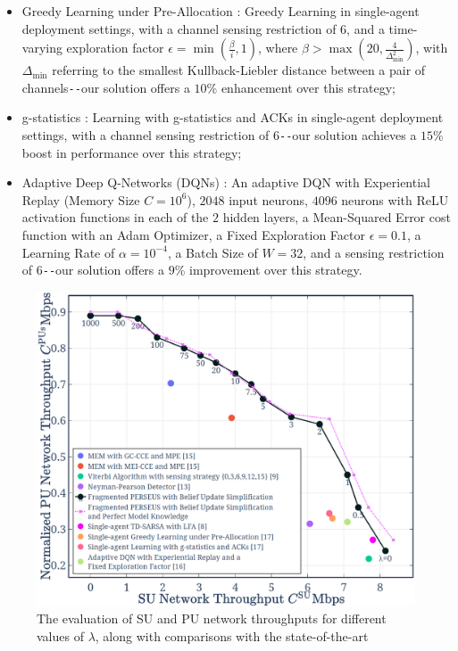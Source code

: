 \documentclass[10pt, twocolumn]{IEEEtran}
\begin{document}
\begin{itemize}
    \item Greedy Learning under Pre-Allocation \cite{WCL:MIT}: Greedy Learning in single-agent deployment settings, with a channel sensing restriction of $6$, and a time-varying exploration factor $\epsilon{=}\min(\frac{\beta}{i}, 1)$, where $\beta{>}\max(20, \frac{4}{\Delta_{\text{min}}^{2}})$, with $\Delta_{\text{min}}$ referring to the smallest Kullback-Liebler distance between a pair of channels\texttt{-{}-}our solution offers a $10$\% enhancement over this strategy;
    \item g-statistics \cite{WCL:MIT}: Learning with g-statistics and ACKs in single-agent deployment settings, with a channel sensing restriction of $6$\texttt{-{}-}our solution achieves a $15$\% boost in performance over this strategy;
    \item Adaptive Deep Q-Networks (DQNs) \cite{WCL:DQN}: An adaptive DQN with Experiential Replay (Memory Size $C{=}10^{6}$), $2048$ input neurons, $4096$ neurons with ReLU activation functions in each of the $2$ hidden layers, a Mean-Squared Error cost function with an Adam Optimizer, a Fixed Exploration Factor $\epsilon{=}0.1$, a Learning Rate of $\alpha{=}10^{-4}$, a Batch Size of $W{=}32$, and a sensing restriction of $6$\texttt{-{}-}our solution offers a $9$\% improvement over this strategy.
\end{itemize}
\vspace{-5mm}
\begin{figure} [t]
    \centerline{
    \includegraphics[width=0.8\linewidth]{figures/Minerva_Single_Agent_SoA_Comparisons_with_penalty.png}}
    \vspace{-2mm}
    \caption{The evaluation of SU and PU network throughputs for different values of $\lambda$, along with comparisons with the state-of-the-art}
    \vspace{-5mm}
    \label{Fig. 4}
\end{figure}
\end{document}
